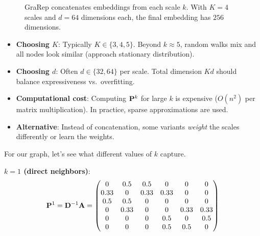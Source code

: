 \begin{notechapter}
\begin{figure}[htbp]
\caption{GraRep concatenates embeddings from each scale $k$. With $K=4$ scales and $d=64$ dimensions each, the final embedding has $256$ dimensions.}
\label{shallow-embeddings:fig:grarep_concat}
\end{figure}

\begin{remark}
\leavevmode
\begin{itemize}
    \item \textbf{Choosing $K$}: Typically $K \in \{3, 4, 5\}$. Beyond $k \approx 5$, random walks mix and all nodes look similar (approach stationary distribution).
    \item \textbf{Choosing $d$}: Often $d \in \{32, 64\}$ per scale. Total dimension $Kd$ should balance expressiveness vs.\ overfitting.
    \item \textbf{Computational cost}: Computing $\mathbf{P}^k$ for large $k$ is expensive ($O(n^2)$ per matrix multiplication). In practice, sparse approximations are used.
    \item \textbf{Alternative}: Instead of concatenation, some variants \emph{weight} the scales differently or learn the weights.
\end{itemize}
\end{remark}

\begin{example}
For our graph, let's see what different values of $k$ capture.

\textbf{$k=1$ (direct neighbors)}:
\[
\mathbf{P}^1 = \mathbf{D}^{-1}\mathbf{A} = \begin{pmatrix}
0 & 0.5 & 0.5 & 0 & 0 & 0 \\
0.33 & 0 & 0.33 & 0.33 & 0 & 0 \\
0.5 & 0.5 & 0 & 0 & 0 & 0 \\
0 & 0.33 & 0 & 0 & 0.33 & 0.33 \\
0 & 0 & 0 & 0.5 & 0 & 0.5 \\
0 & 0 & 0 & 0.5 & 0.5 & 0
\end{pmatrix}
\]


\end{example}
\end{notechapter}
